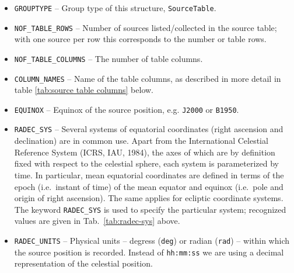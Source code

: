 \documentclass[a4paper,10pt,bibtotoc]{scrartcl}
\begin{document}
\begin{itemize}
\item \verb|GROUPTYPE| -- Group type of this structure, \texttt{SourceTable}.
\item \verb|NOF_TABLE_ROWS| -- Number of sources listed/collected in
  the source table; with one source per row this corresponds to the
  number or table rows.
\item \verb|NOF_TABLE_COLUMNS| -- The number of table columns.
\item \verb|COLUMN_NAMES| -- Name of the table columns, as described
  in more detail in table \ref{tab:source table columns} below.
\item \verb|EQUINOX| -- Equinox of the source position,
  e.g. \texttt{J2000} or \texttt{B1950}.
\item \verb|RADEC_SYS| -- Several systems of equatorial coordinates
  (right ascension and declination) are in common use. Apart from the
  International Celestial Reference System (ICRS, IAU, 1984), the axes
  of which are by definition fixed with respect to the celestial sphere, each
  system is parameterized by time. In particular, mean equatorial
  coordinates are defined in terms of the epoch (i.e.\ instant of
  time) of the mean equator and equinox (i.e.\ pole and origin of
  right ascension). The same applies for ecliptic coordinate
  systems. The keyword \verb|RADEC_SYS| is used to specify the
  particular system; recognized values are given in
  Tab.~\ref{tab:radec-sys} above.
\item \verb|RADEC_UNITS| -- Physical units -- degress (\texttt{deg})
  or radian (\texttt{rad})  -- within which the source position is
  recorded. Instead of \texttt{hh:mm:ss} we are using a decimal
  representation of the celestial position.
\end{itemize}
\end{document}
